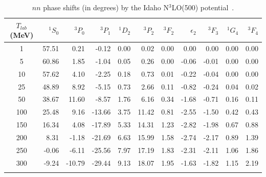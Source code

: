 \documentclass[sort&compress,preprint,3p]{elsarticle}
\begin{document}
\begin{table}
\caption{$nn$ phase shifts (in degrees) by the Idaho N$^3$LO(500) potential~\cite{EM03}.
\label{tab_nn}}
\smallskip
\begin{tabular*}{\textwidth}{@{\extracolsep{\fill}}crrrrrrrrrr}
\hline 
\hline 
\noalign{\smallskip}
 $T_{lab}$ (MeV)
 & $^1S_0$
 & $^3P_0$
 & $^3P_1$
 & $^1D_2$
 & $^3P_2$
 & $^3F_2$
 & $\epsilon_2$
 & $^3F_3$
 & $^1G_4$
 & $^3F_4$
\\
 \hline 
    1 &  57.51 &   0.21 &  -0.12 &   0.00 &   0.02 &   0.00 &   0.00 &   0.00 &   0.00 &   0.00 \\
    5 &  60.86 &   1.85 &  -1.04 &   0.05 &   0.26 &   0.00 &  -0.06 &  -0.01 &   0.00 &   0.00 \\
   10 &  57.62 &   4.10 &  -2.25 &   0.18 &   0.73 &   0.01 &  -0.22 &  -0.04 &   0.00 &   0.00 \\
   25 &  48.89 &   8.92 &  -5.15 &   0.73 &   2.66 &   0.11 &  -0.82 &  -0.24 &   0.04 &   0.02 \\
   50 &  38.67 &  11.60 &  -8.57 &   1.76 &   6.16 &   0.34 &  -1.68 &  -0.71 &   0.16 &   0.11 \\
  100 &  25.48 &   9.16 & -13.66 &   3.75 &  11.42 &   0.81 &  -2.55 &  -1.50 &   0.42 &   0.43 \\
  150 &  16.34 &   4.08 & -17.89 &   5.33 &  14.31 &   1.23 &  -2.82 &  -1.98 &   0.67 &   0.88 \\
  200 &   8.31 &  -1.18 & -21.69 &   6.63 &  15.99 &   1.58 &  -2.74 &  -2.17 &   0.89 &   1.39 \\
  250 &  -0.06 &  -6.11 & -25.56 &   7.97 &  17.19 &   1.83 &  -2.31 &  -2.11 &   1.06 &   1.86 \\
  300 &  -9.24 & -10.79 & -29.44 &   9.13 &  18.07 &   1.95 &  -1.63 &  -1.82 &   1.15 &   2.19 \\
\hline
\hline
\noalign{\smallskip}
\end{tabular*}
\end{table}
\end{document}
